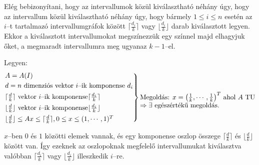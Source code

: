 Elég bebizonyítani, hogy az intervallumok közül kiválasztható néhány úgy, hogy
az intervallum közül kiválasztható néhány úgy, hogy bármely $1 \leq i \leq n$
esetén az $i$--t tartalmazó intervallumgráfok között $\lceil \frac{d_i}{k}
\rceil$ vagy $\lfloor \frac{d_i}{k} \rfloor$ darab kiválasztott legyen. Ekkor a
kiválasztott intervallumokat megszínezzük egy színnel majd elhagyjuk őket, a
megmaradt intervallumra meg ugyanaz $k-1$--el.

Legyen:
\[\begin{rcases}
A=A(I) \\
d = n \text{ dimenziós vektor } i \text{--ik komponense } d_i \\
\lceil \frac{d}{k} \rceil \text{ vektor } i \text{--ik komponense} \lceil \frac{d_i}{k} \rceil \\
\lfloor \frac{d}{k} \rfloor \text{ vektor } i \text{--ik komponense} \lfloor \frac{d_i}{k} \rfloor \\
\lfloor \frac{d}{k} \rfloor \leq Ax \leq \lceil \frac{d}{k} \rceil, 0 \leq x \leq (1,\cdots, 1)^T
\end{rcases} \parbox[t]{6cm}{Megoldás: $x=\left( \frac{1}{k}, \cdots, \frac{1}{k} \right)^T$ ahol $A$
TU $\Rightarrow \exists$ egészértékű megoldás.} 
\]

$x$--ben $0$ és $1$ közötti elemek vannak, és egy komponense oszlop összege
$\lceil \frac{d}{k} \rceil$ és $ \lfloor \frac{d}{k} \rfloor$ között van. Így
ezeknek az oszlopoknak megfelelő intervallumukat kiválasztva valóbban $\lceil
\frac{d_i}{k} \rceil$ vagy $ \lfloor \frac{d_i}{k} \rfloor$ illeszkedik $i$--re.
